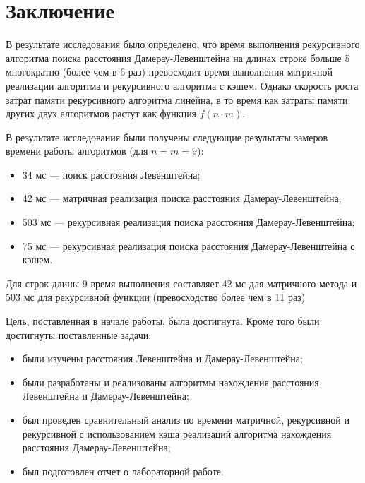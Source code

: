 \chapter*{Заключение}

В результате исследования было определено, что время выполнения рекурсивного алгоритма поиска расстояния Дамерау-Левенштейна на длинах строке больше 5 многократно (более чем в 6 раз) превосходит время выполнения матричной реализации алгоритма и рекурсивного алгоритма с кэшем. Однако скорость роста затрат памяти рекурсивного алгоритма линейна, в то время как затраты памяти других двух алгоритмов растут как функция $f(n\cdot m)$. 

В результате исследования были получены следующие результаты замеров времени работы алгоритмов (для $n = m = 9$):
\begin{itemize}
	\item 34 мс --- поиск расстояния Левенштейна;
	\item 42 мс ---  матричная реализация поиска расстояния Дамерау\hyp{}Левенштейна;
	\item 503 мс --- рекурсивная реализация поиска расстояния Дамерау\hyp{}Левенштейна;
	\item 75 мс --- рекурсивная реализация поиска расстояния Дамерау\hyp{}Левенштейна с кэшем.
\end{itemize}
 Для строк длины 9 время выполнения составляет 42 мс для матричного метода и 503 мс для рекурсивной функции (превосходство более чем в 11 раз)

Цель, поставленная в начале работы, была достигнута. Кроме того были достигнуты поставленные задачи:

\begin{itemize}
	\item были изучены расстояния Левенштейна и Дамерау-Левенштейна;
	\item были разработаны и реализованы алгоритмы нахождения расстояния Левенштейна и Дамерау-Левенштейна;
	\item был проведен сравнительный анализ по времени матричной, рекурсивной и рекурсивной с использованием кэша реализаций алгоритма нахождения расстояния Дамерау-Левенштейна;
	\item был подготовлен отчет о лабораторной работе.
\end{itemize}